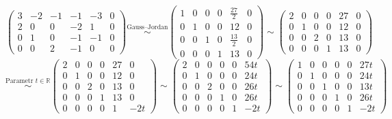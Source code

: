 \documentclass[12pt]{article}
\begin{document}
\begin{enumerate}
  \[
    \left(\begin{array}{ccccc|c}
      3 & -2 & -1 & -1 & -3 & 0 \\
      2 & 0 & 0 & -2 & 1 & 0 \\
      0 & 1 & 0 & -1 & -1 & 0 \\
      0 & 0 & 2 & -1 & 0 & 0
    \end{array}\right)
    \overset{\text{Gauss--Jordan}}{\sim}
    \left(\begin{array}{ccccc|c}
      1 & 0 & 0 & 0 & \frac{27}{2} & 0 \\
      0 & 1 & 0 & 0 & 12 & 0 \\
      0 & 0 & 1 & 0 & \frac{13}{2} & 0 \\
      0 & 0 & 0 & 1 & 13 & 0
    \end{array}\right)
    \sim
    \left(\begin{array}{ccccc|c}
      2 & 0 & 0 & 0 & 27 & 0 \\
      0 & 1 & 0 & 0 & 12 & 0 \\
      0 & 0 & 2 & 0 & 13 & 0 \\
      0 & 0 & 0 & 1 & 13 & 0
    \end{array}\right)
  \]
  \[
    \overset{\text{Parametr } t\in\mathbb{R}}{\sim}
    \left(\begin{array}{ccccc|c}
      2 & 0 & 0 & 0 & 27 & 0 \\
      0 & 1 & 0 & 0 & 12 & 0 \\
      0 & 0 & 2 & 0 & 13 & 0 \\
      0 & 0 & 0 & 1 & 13 & 0 \\ \hline
      0 & 0 & 0 & 0 & 1 & -2t
    \end{array}\right)
    \sim
    \left(\begin{array}{ccccc|c}
      2 & 0 & 0 & 0 & 0 & 54t \\
      0 & 1 & 0 & 0 & 0 & 24t \\
      0 & 0 & 2 & 0 & 0 & 26t \\
      0 & 0 & 0 & 1 & 0 & 26t \\ \hline
      0 & 0 & 0 & 0 & 1 & -2t
    \end{array}\right)
    \sim
    \left(\begin{array}{ccccc|c}
      1 & 0 & 0 & 0 & 0 & 27t \\
      0 & 1 & 0 & 0 & 0 & 24t \\
      0 & 0 & 1 & 0 & 0 & 13t \\
      0 & 0 & 0 & 1 & 0 & 26t \\ \hline
      0 & 0 & 0 & 0 & 1 & -2t
    \end{array}\right)
  \]


\end{enumerate}
\end{document}
